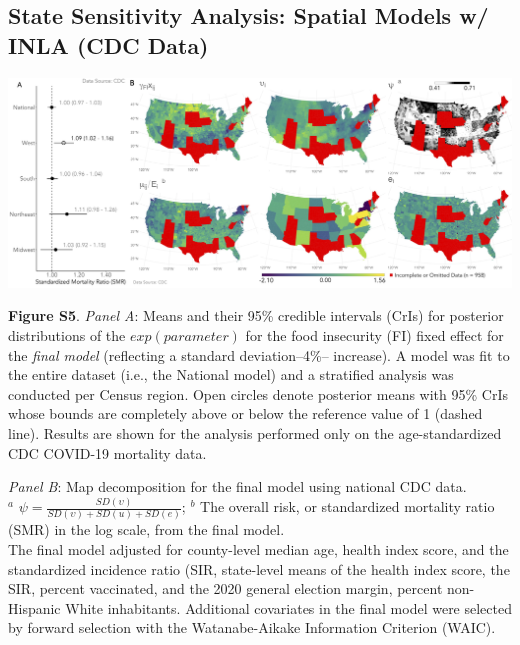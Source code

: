 \documentclass{beamer}
\begin{document}
\subsection{State Sensitivity Analysis: Spatial Models w/ INLA (CDC Data)}
\begin{frame}
	
	
	
	\vspace*{-0.04 cm}
	\hspace*{-0.45 cm}
	\includegraphics[scale=0.152]{images-logos/sensitivity-combo-forest-map-decomp-cdc.png}
	
	\raggedright
	\tiny{\textbf{Figure S5}. \textit{Panel A}: Means and their 95\% credible intervals (CrIs) for posterior distributions of the $exp(parameter)$ for the food insecurity (FI) fixed effect for the \textit{final model} (reflecting a standard deviation--4\%-- increase). A model was fit to the entire dataset (i.e., the National model) and a stratified analysis was conducted per Census region. Open circles denote posterior means with 95\% CrIs whose bounds are completely above or below the reference value of 1 (dashed line). Results are shown for the analysis performed only on the age-standardized CDC COVID-19 mortality data. 
		
		\vspace{0.25cm}
		
		\textit{Panel B}: Map decomposition for the final model using national CDC data.\\
		$^a$ $\psi=\frac{SD(\upsilon)}{SD(\upsilon)+SD(u)+SD(e)}$;
		$^b$ The overall risk, or standardized mortality ratio (SMR) in the log scale, from the final model.\\
		The final model adjusted for county-level median age, health index score, and the standardized incidence ratio (SIR, state-level means of the health index score, the SIR, percent vaccinated, and the 2020 general election margin, percent non-Hispanic White inhabitants. Additional covariates in the final model were selected by forward selection with the Watanabe-Aikake Information Criterion (WAIC).}
	
	
\end{frame}
	
\end{document}
